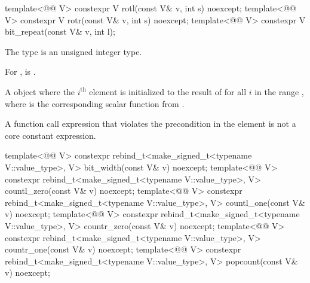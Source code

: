 \begin{itemdecl}
template<@@ V> constexpr V rotl(const V& v, int s) noexcept;
template<@@ V> constexpr V rotr(const V& v, int s) noexcept;
template<@@ V> constexpr V bit_repeat(const V& v, int l);
\end{itemdecl}

\begin{itemdescr}
\pnum
\constraints
The type  is an unsigned integer type.

\pnum
\expects
For ,
 is .

\pnum
\returns
A  object where the $i^\text{th}$ element is initialized to
the result of  for all $i$ in the
range , where  is the corresponding
scalar function from .

\pnum
\remarks
A function call expression that violates the precondition in the \expects
element is not a core constant expression.
\end{itemdescr}

\begin{itemdecl}
template<@@ V>
  constexpr rebind_t<make_signed_t<typename V::value_type>, V> bit_width(const V& v) noexcept;
template<@@ V>
  constexpr rebind_t<make_signed_t<typename V::value_type>, V> countl_zero(const V& v) noexcept;
template<@@ V>
  constexpr rebind_t<make_signed_t<typename V::value_type>, V> countl_one(const V& v) noexcept;
template<@@ V>
  constexpr rebind_t<make_signed_t<typename V::value_type>, V> countr_zero(const V& v) noexcept;
template<@@ V>
  constexpr rebind_t<make_signed_t<typename V::value_type>, V> countr_one(const V& v) noexcept;
template<@@ V>
  constexpr rebind_t<make_signed_t<typename V::value_type>, V> popcount(const V& v) noexcept;
\end{itemdecl}

